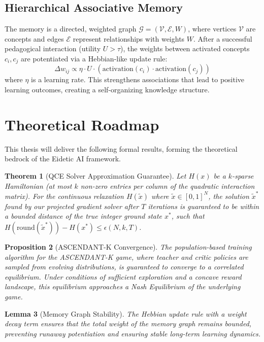 \documentclass[11pt, letterpaper]{article}
\newtheorem{theorem}{Theorem}[section]
\newtheorem{lemma}[theorem]{Lemma}
\newtheorem{proposition}[theorem]{Proposition}
\begin{document}
\subsection{Hierarchical Associative Memory}
The memory is a directed, weighted graph $\mathcal{G} = (\mathcal{V}, \mathcal{E}, W)$, where vertices $\mathcal{V}$ are concepts and edges $\mathcal{E}$ represent relationships with weights $W$. After a successful pedagogical interaction (utility $U > \tau$), the weights between activated concepts $c_i, c_j$ are potentiated via a Hebbian-like update rule:
\begin{equation}
\Delta w_{ij} \propto \eta \cdot U \cdot (\text{activation}(c_i) \cdot \text{activation}(c_j))
\end{equation}
where $\eta$ is a learning rate. This strengthens associations that lead to positive learning outcomes, creating a self-organizing knowledge structure.

\section{Theoretical Roadmap}
This thesis will deliver the following formal results, forming the theoretical bedrock of the Eidetic AI framework.

\begin{theorem}[QCE Solver Approximation Guarantee]
Let $H(x)$ be a $k$-sparse Hamiltonian (at most $k$ non-zero entries per column of the quadratic interaction matrix). For the continuous relaxation $H(\tilde{x})$ where $\tilde{x} \in [0,1]^N$, the solution $\tilde{x}^*$ found by our projected gradient solver after $T$ iterations is guaranteed to be within a bounded distance of the true integer ground state $x^*$, such that $H(\text{round}(\tilde{x}^*)) - H(x^*) \le \epsilon(N, k, T)$.
\end{theorem}

\begin{proposition}[ASCENDANT-K Convergence]
The population-based training algorithm for the ASCENDANT-K game, where teacher and critic policies are sampled from evolving distributions, is guaranteed to converge to a correlated equilibrium. Under conditions of sufficient exploration and a concave reward landscape, this equilibrium approaches a Nash Equilibrium of the underlying game.
\end{proposition}

\begin{lemma}[Memory Graph Stability]
The Hebbian update rule with a weight decay term ensures that the total weight of the memory graph remains bounded, preventing runaway potentiation and ensuring stable long-term learning dynamics.
\end{lemma}

\printbibliography
\end{document}
